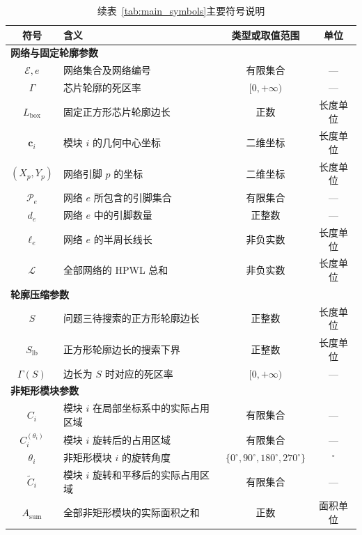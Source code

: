 \begin{table}[H]
\centering
\caption*{续表~\ref{tab:main_symbols}\quad 主要符号说明}
\begin{tabular}{c p{6.4cm} c c}
  \toprule
  符号 & 含义 & 类型或取值范围 & 单位 \\
  \midrule
  \multicolumn{4}{l}{\textbf{网络与固定轮廓参数}}\\
  $\mathcal{E},e$ & 网络集合及网络编号 & 有限集合 & --- \\
  $\Gamma$ & 芯片轮廓的死区率 & $[0,+\infty)$ & --- \\
  $L_{\mathrm{box}}$ & 固定正方形芯片轮廓边长 & 正数 & 长度单位 \\
  $\boldsymbol{c}_i$ & 模块 $i$ 的几何中心坐标 & 二维坐标 & 长度单位 \\
  $(X_p,Y_p)$ & 网络引脚 $p$ 的坐标 & 二维坐标 & 长度单位 \\
  $\mathcal{P}_e$ & 网络 $e$ 所包含的引脚集合 & 有限集合 & --- \\
  $d_e$ & 网络 $e$ 中的引脚数量 & 正整数 & --- \\
  $\ell_e$ & 网络 $e$ 的半周长线长 & 非负实数 & 长度单位 \\
  $\mathcal{L}$ & 全部网络的 HPWL 总和 & 非负实数 & 长度单位 \\

  \multicolumn{4}{l}{\textbf{轮廓压缩参数}}\\
  $S$ & 问题三待搜索的正方形轮廓边长 & 正整数 & 长度单位 \\
  $S_{\mathrm{lb}}$ & 正方形轮廓边长的搜索下界 & 正整数 & 长度单位 \\
  $\Gamma(S)$ & 边长为 $S$ 时对应的死区率 & $[0,+\infty)$ & --- \\

  \multicolumn{4}{l}{\textbf{非矩形模块参数}}\\
  $C_i$ & 模块 $i$ 在局部坐标系中的实际占用区域 & 有限集合 & --- \\
  $C_i^{(\theta_i)}$ & 模块 $i$ 旋转后的占用区域 & 有限集合 & --- \\
  $\theta_i$ & 非矩形模块 $i$ 的旋转角度 & $\{0^\circ,90^\circ,180^\circ,270^\circ\}$ & $^\circ$ \\
  $\widetilde C_i$ & 模块 $i$ 旋转和平移后的实际占用区域 & 有限集合 & --- \\
  $A_{\mathrm{sum}}$ & 全部非矩形模块的实际面积之和 & 正数 & 面积单位 \\
  \bottomrule
\end{tabular}
\end{table}
\endgroup
